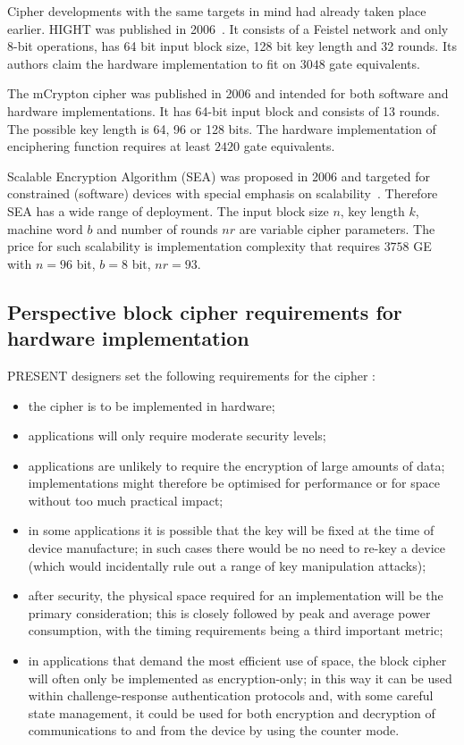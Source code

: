 Cipher developments with the same targets in mind had already taken place
earlier. HIGHT was published in
2006~\cite{DBLP:conf:ches:HongSHLLKLCLJKKC06}. It consists of a Feistel network
and only 8-bit operations, has 64 bit input block size, 128 bit key length and
32 rounds. Its authors claim the hardware implementation to fit on $ 3048 $ gate
equivalents.

The mCrypton cipher was published in 2006 and intended for both software
and hardware implementations. It has 64-bit input block and consists of 13 rounds.
The possible key length is 64, 96 or 128 bits. The hardware implementation of
enciphering function requires at least $ 2420 $ gate equivalents.

Scalable Encryption Algorithm (SEA) was proposed in 2006 and targeted for
constrained (software) devices with special emphasis on scalability~\cite{sea}.
Therefore SEA has a wide range of deployment. The input block size $ n $,
key length $ k $, machine word $ b $ and number of rounds $ nr $ are variable
cipher parameters. The price for such scalability is implementation complexity
that requires $ 3758 $ GE with $ n = 96 $ bit, $ b = 8 $ bit, $ nr = 93 $.

\subsection{Perspective block cipher requirements for hardware \mbox{implementation}}

PRESENT designers set the following requirements for the cipher \cite{ches:present:2007}:
\begin{itemize}
    \setlength{\itemsep}{0pt}%
        \setlength{\parskip}{0pt}%
    \item the cipher is to be implemented in hardware;
    \item applications will only require moderate security levels;
    \item applications are unlikely to require the encryption of large amounts
        of data; implementations might therefore be optimised for performance or
        for space without too much practical impact;
    \item in some applications it is possible that the key will be fixed at the
        time of device manufacture; in such cases there would be no need to
        re-key a device (which would incidentally rule out a range of key
        manipulation attacks);
    \item after security, the physical space required for an implementation will
        be the primary consideration; this is closely followed by peak and
        average power consumption, with the timing requirements being a third
        important metric;
    \item in applications that demand the most efficient use of space, the block
        cipher will often only be implemented as encryption-only; in this way it
        can be used within challenge-response authentication protocols and,
        with some careful state management, it could be used for both encryption
        and decryption of communications to and from the device by using the
        counter mode.
\end{itemize}

